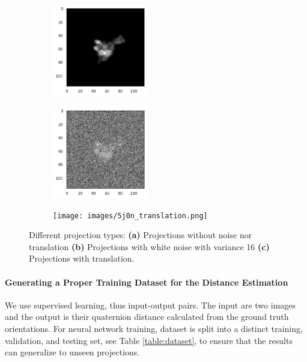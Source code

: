 \begin{figure}
    \centering
    \begin{subfigure}[b]{0.3\textwidth}
        \includegraphics[height=4cm]{images/5j0n_noise0.png}
        \caption{}
    \end{subfigure}
    \hfill
    \begin{subfigure}[b]{0.3\textwidth}
    \centering
        \includegraphics[height=4cm]{images/5j0n_noise16.png}
        \caption{}
    \end{subfigure}
    \hfill
    \begin{subfigure}[b]{0.3\textwidth}
    \centering
        \texttt{[image: images/5j0n\_translation.png]}
        \caption{}
    \end{subfigure}
    \caption{Different projection types:
    \textbf{(a)} Projections without noise nor translation
    \textbf{(b)} Projections with white noise with variance 16
    \textbf{(c)} Projections with translation.}
    \label{fig:different-projections}
\end{figure}



\paragraph{Generating a Proper Training Dataset for the Distance Estimation}
We use supervised learning, thus input-output pairs. 
The input are two images and the output is their quaternion distance calculated from the ground truth orientations. 
For neural network training, dataset is split into a distinct training, validation, and testing set, see Table \ref{table:dataset}, to ensure that the results can generalize to unseen projections.


